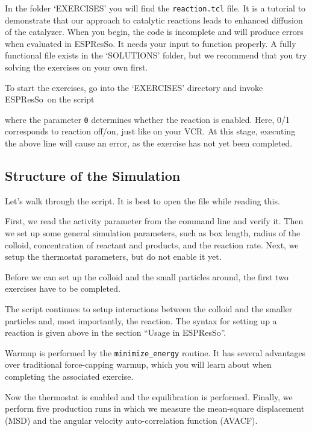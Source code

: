 \documentclass[aip,jcp,reprint,a4paper,onecolumn,nofootinbib,amsmath,amssymb]{revtex4-1}
\newcommand\code{\lstinline}
\newcommand{\es}{\mbox{\textsf{ESPResSo}}\xspace}
\newcommand\codees{\lstinline[language=espresso]}
\begin{document}
In the folder `EXERCISES' you will find the \code{reaction.tcl} file. It is a tutorial to demonstrate that our approach to catalytic reactions leads to enhanced diffusion of the catalyzer. When you begin, the code is incomplete and will produce errors when evaluated in \es. It needs your input to function properly. A fully functional file exists in the `SOLUTIONS' folder, but we recommend that you try solving the exercises on your own first.

To start the exercises, go into the `EXERCISES' directory and invoke \es\ on the script
where the parameter \code{0} determines whether the reaction is enabled. Here, 0/1 corresponds to reaction off/on, just like on your VCR. At this stage, executing the above line will cause an error, as the exercise has not yet been completed.

\subsection{Structure of the Simulation}

Let's walk through the script. It is best to open the file while reading this.

First, we read the activity parameter from the command line and verify it. Then we set up some general simulation parameters, such as box length, radius of the colloid, concentration of reactant and products, and the reaction rate. Next, we setup the thermostat parameters, but do not enable it yet.

Before we can set up the colloid and the small particles around, the first two exercises have to be completed.

The script continues to setup interactions between the colloid and the smaller particles and, most importantly, the reaction. The syntax for setting up a reaction is given above in the section ``Usage in \es''.

Warmup is performed by the \codees{minimize_energy} routine. It has several advantages over traditional force-capping warmup, which you will learn about when completing the associated exercise.

Now the thermostat is enabled and the equilibration is performed. Finally, we perform five production runs in which we measure the mean-square displacement (MSD) and the angular velocity auto-correlation function (AVACF).
\end{document}
